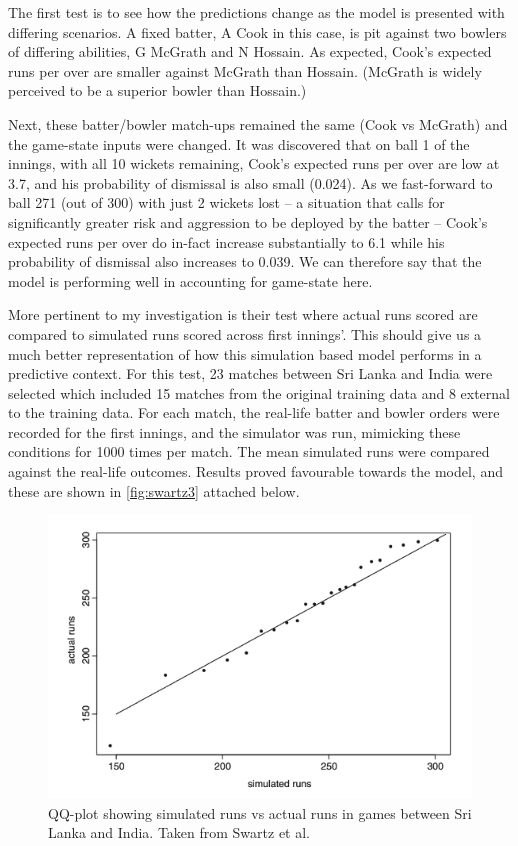 The first test is to see how the predictions change as the model is presented with differing scenarios. A fixed batter, A Cook in this case, is pit against two bowlers of differing abilities, G McGrath and N Hossain. As expected, Cook’s expected runs per over are smaller against McGrath than Hossain. (McGrath is widely perceived to be a superior bowler than Hossain.)

Next, these batter/bowler match-ups remained the same (Cook vs McGrath) and the game-state inputs were changed. It was discovered that on ball 1 of the innings, with all 10 wickets remaining, Cook’s expected runs per over are low at 3.7, and his probability of dismissal is also small (0.024). As we fast-forward to ball 271 (out of 300) with just 2 wickets lost – a situation that calls for significantly greater risk and aggression to be deployed by the batter – Cook’s expected runs per over do in-fact increase substantially to 6.1 while his probability of dismissal also increases to 0.039. We can therefore say that the model is performing well in accounting for game-state here.

More pertinent to my investigation is their test where actual runs scored are compared to simulated runs scored across first innings’. This should give us a much better representation of how this simulation based model performs in a predictive context. For this test, 23 matches between Sri Lanka and India were selected which included 15 matches from the original training data and 8 external to the training data.  For each match, the real-life batter and bowler orders were recorded for the first innings, and the simulator was run, mimicking these conditions for 1000 times per match. The mean simulated runs were compared against the real-life outcomes. Results proved favourable towards the model, and these are shown in \autoref{fig:swartz3} attached below.

\begin{figure}[h]
    \centering
    \includegraphics{images/swartz3.png}
    \caption{QQ-plot showing simulated runs vs actual runs in games between Sri Lanka and India. Taken from Swartz et al.}
    \label{fig:swartz3}
\end{figure}

